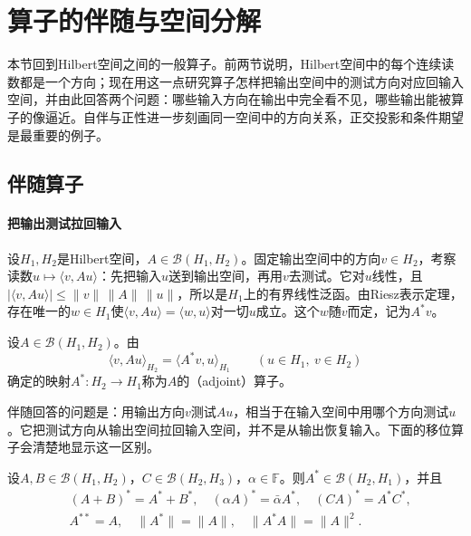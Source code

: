 
\section{算子的伴随与空间分解}
\label{sec:lfo-adjoint}

本节回到Hilbert空间之间的一般算子。前两节说明，Hilbert空间中的每个连续读数都是一个方向；现在用这一点研究算子怎样把输出空间中的测试方向对应回输入空间，并由此回答两个问题：哪些输入方向在输出中完全看不见，哪些输出能被算子的像逼近。自伴与正性进一步刻画同一空间中的方向关系，正交投影和条件期望是最重要的例子。

\subsection{伴随算子}
\label{sec:lfo-adjoint-def}

\paragraph{把输出测试拉回输入}
设$H_1,H_2$是Hilbert空间，$A\in\mathcal B(H_1,H_2)$。固定输出空间中的方向$v\in H_2$，考察读数$u\mapsto\langle v,Au\rangle$：先把输入$u$送到输出空间，再用$v$去测试。它对$u$线性，且$|\langle v,Au\rangle|\leq\|v\|\,\|A\|\,\|u\|$，所以是$H_1$上的有界线性泛函。由Riesz表示定理，存在唯一的$w\in H_1$使$\langle v,Au\rangle=\langle w,u\rangle$对一切$u$成立。这个$w$随$v$而定，记为$A^*v$。

\begin{definition}[伴随算子]
\label{def:lfo-adjoint}
设$A\in\mathcal B(H_1,H_2)$。由
\begin{equation}
 \langle v,Au\rangle_{H_2}=\langle A^*v,u\rangle_{H_1}\qquad(u\in H_1,\ v\in H_2)
 \label{eq:lfo-adjoint}
\end{equation}
确定的映射$A^*:H_2\to H_1$称为$A$的（adjoint）算子。
\end{definition}

伴随回答的问题是：用输出方向$v$测试$Au$，相当于在输入空间中用哪个方向测试$u$。它把测试方向从输出空间拉回输入空间，并不是从输出恢复输入。下面的移位算子会清楚地显示这一区别。

\begin{theorem}[伴随的基本性质]
\label{thm:lfo-adjoint-properties}
设$A,B\in\mathcal B(H_1,H_2)$，$C\in\mathcal B(H_2,H_3)$，$\alpha\in\mathbb F$。则$A^*\in\mathcal B(H_2,H_1)$，并且
\[
 \begin{aligned}
 &(A+B)^*=A^*+B^*,\quad(\alpha A)^*=\bar\alpha A^*,\quad(CA)^*=A^*C^*,\\
 &A^{**}=A,\quad\|A^*\|=\|A\|,\quad\|A^*A\|=\|A\|^2 .
 \end{aligned}
\]
\end{theorem}

